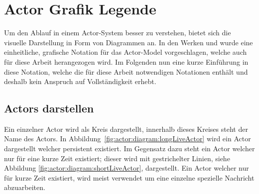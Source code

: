 \section{Actor Grafik Legende}\label{actor:diagram:description}
Um den Ablauf in einem Actor-System besser zu verstehen, bietet sich die visuelle Darstellung in Form von Diagrammen an. In den Werken \cite{kuhn2017reactive} und \cite{Vernon2015ReactiveAkka} wurde eine einheitliche, grafische Notation für das  Actor-Model vorgeschlagen, welche auch für diese Arbeit herangezogen wird. Im Folgenden nun eine kurze Einführung in diese Notation, welche die für diese Arbeit notwendigen Notationen enthält und deshalb kein Anspruch auf Vollständigkeit erhebt.\\
\subsection{Actors darstellen}
Ein einzelner Actor wird als Kreis dargestellt, innerhalb dieses Kreises steht der Name des Actors. In Abbildung~\ref{fig:actor:diagram:longLiveActor} wird ein Actor dargestellt welcher persistent existiert. Im Gegensatz dazu steht ein Actor welcher nur für eine kurze Zeit existiert; dieser wird mit gestrichelter Linien, siehe Abbildung \ref{fig:actor:diagram:shortLiveActor}, dargestellt. Ein Actor welcher nur für kurze Zeit existiert, wird meist verwendet um eine einzelne spezielle Nachricht abzuarbeiten. 
